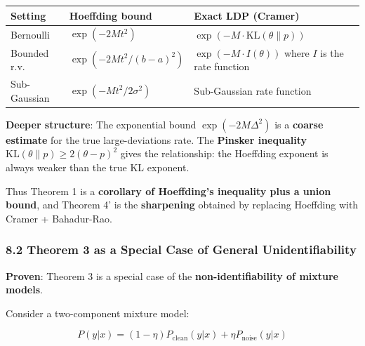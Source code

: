 \documentclass[
  12pt,
]{article}
\begin{document}
\begin{longtable}[]{@{}
  >{\raggedright\arraybackslash}p{}
  >{\raggedright\arraybackslash}p{}
  >{\raggedright\arraybackslash}p{}@{}}
\toprule\noalign{}
\begin{minipage}[b]{\linewidth}\raggedright
Setting
\end{minipage} & \begin{minipage}[b]{\linewidth}\raggedright
Hoeffding bound
\end{minipage} & \begin{minipage}[b]{\linewidth}\raggedright
Exact LDP (Cramer)
\end{minipage} \\
\midrule\noalign{}
\endhead
\bottomrule\noalign{}
\endlastfoot
Bernoulli & \(\exp(-2Mt^2)\) &
\(\exp(-M \cdot \text{KL}(\theta\|p))\) \\
Bounded r.v. & \(\exp(-2Mt^2 / (b-a)^2)\) & \(\exp(-M \cdot I(\theta))\)
where \(I\) is the rate function \\
Sub-Gaussian & \(\exp(-Mt^2 / 2\sigma^2)\) & Sub-Gaussian rate
function \\
\end{longtable}

\textbf{Deeper structure}: The exponential bound \(\exp(-2M\Delta^2)\)
is a \textbf{coarse estimate} for the true large-deviations rate. The
\textbf{Pinsker inequality} \(\text{KL}(\theta\|p) \geq 2(\theta-p)^2\)
gives the relationship: the Hoeffding exponent is always weaker than the
true KL exponent.

Thus Theorem 1 is a \textbf{corollary of Hoeffding's inequality plus a
union bound}, and Theorem 4' is the \textbf{sharpening} obtained by
replacing Hoeffding with Cramer + Bahadur-Rao.

\subsubsection{8.2 Theorem 3 as a Special Case of General
Unidentifiability}\label{theorem-3-as-a-special-case-of-general-unidentifiability}

\textbf{Proven}: Theorem 3 is a special case of the
\textbf{non-identifiability of mixture models}.

Consider a two-component mixture model:

\[P(y | x) = (1-\eta)P_{\text{clean}}(y | x) + \eta P_{\text{noise}}(y | x)\]
\end{document}
